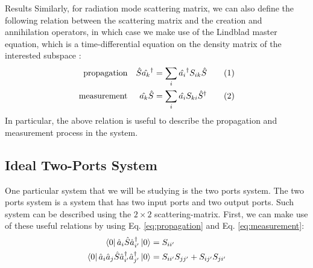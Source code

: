 \documentclass[%
 aps,
 reprint,
 twocolumn,
 amsmath,amssymb,
floatfix,
]{revtex4-2}
\newcommand\tagthis{\addtocounter{equation}{1}\tag{\theequation}}
\begin{document}
\begin{section}{Results}
Similarly, for radiation mode scattering matrix, we can also define the following relation between the scattering matrix and the creation and annihilation operators, in which case we make use of the Lindblad master equation, which is a time-differential equation on the density matrix of the interested subspace \cite{minganti_quantum_2019,arkhipov_liouvillian_2020}:
\begin{align*}
	\text{propagation} &  & \hat{S}\hat{a_k}^\dagger & = \sum_i \hat{a_i}^\dagger S_{ik} \hat{S} \tagthis \label{eq:propagation} \\
	\text{measurement} &  & \hat{a_k}\hat{S}   & = \sum_i \hat{a_i} S_{ki} \hat{S}^\dagger \tagthis \label{eq:measurement}
\end{align*}
In particular, the above relation is useful to describe the propagation and measurement process in the system.

\subsection{Ideal Two-Ports System}
One particular system that we will be studying is the two ports system. The two ports system is a system that has two input ports and two output ports. Such system can be described using the $2 × 2$ scattering-matrix. First, we can make use of these useful relations by using Eq. \ref{eq:propagation} and Eq. \ref{eq:measurement}:
\begin{align*}
	\bra{0}\hat{a}_{i}\hat{S}\hat{a}_{i'}^\dagger\ket{0}                                & = S_{ii'}                         \\
	\bra{0}\hat{a}_{i}\hat{a}_{j}\hat{S}\hat{a}_{i'}^\dagger\hat{a}_{j'}^\dagger\ket{0} & = S_{ii'}S_{jj'} + S_{ij'}S_{ji'}
\end{align*}


\end{section}
\end{document}
